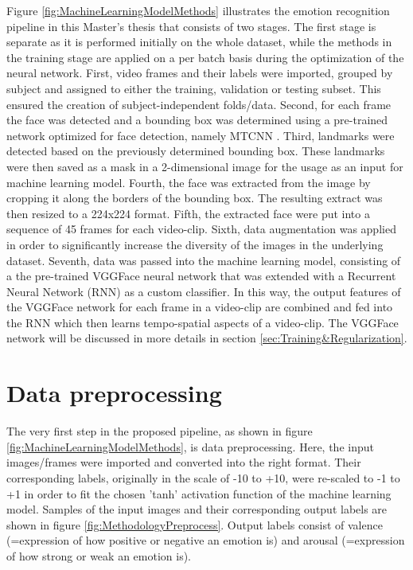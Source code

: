 Figure \ref{fig:MachineLearningModelMethods} illustrates the emotion recognition pipeline in this Master's thesis that consists of two stages. The first stage is separate as it is performed initially on the whole dataset, while the methods in the training stage are applied on a per batch basis during the optimization of the neural network.
\newline\newline
First, video frames and their labels were imported, grouped by subject and assigned to either the training, validation or testing subset. This ensured the creation of subject-independent folds/data. Second, for each frame the face was detected and a bounding box was determined using a pre-trained network optimized for face detection, namely MTCNN \citep{Zhang:2016:MTCCN}.
\newline\newline
Third, landmarks were detected based on the previously determined bounding box. These landmarks were then saved as a mask in a 2-dimensional image for the usage as an input for machine learning model. Fourth, the face was extracted from the image by cropping it along the borders of the bounding box. The resulting extract was then resized to a 224x224 format. Fifth, the extracted face were put into a sequence of 45 frames for each video-clip.
\newline\newline
Sixth, data augmentation was applied in order to significantly increase the diversity of the images in the underlying dataset. Seventh, data was passed into the machine learning model, consisting of a the pre-trained VGGFace \citep{Cao:2018:VGGFace2} neural network that was extended with a Recurrent Neural Network (RNN) as a custom classifier. In this way, the output features of the VGGFace network for each frame in a video-clip are combined and fed into the RNN which then learns  tempo-spatial aspects of a video-clip. The VGGFace network will be discussed in more details in section \ref{sec:Training&Regularization}.

\section{Data preprocessing}
The very first step in the proposed pipeline, as shown in figure \ref{fig:MachineLearningModelMethods}, is data preprocessing. Here, the input images/frames were imported and converted into the right format. Their corresponding labels, originally in the scale of -10 to +10, were re-scaled to -1 to +1 in order to fit the chosen 'tanh' activation function of the machine learning model.
\newline\newline
Samples of the input images and their corresponding output labels are shown in figure \ref{fig:MethodologyPreprocess}. Output labels consist of valence (=expression of how positive or negative an emotion is) and arousal (=expression of how strong or weak an emotion is).

